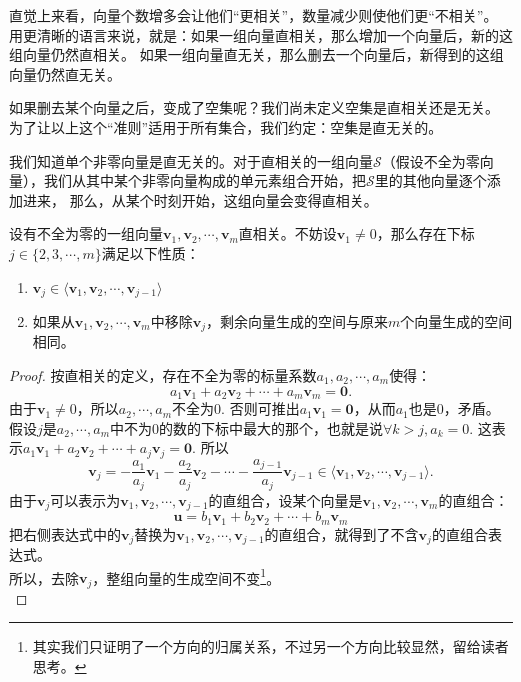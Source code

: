 \documentclass[12pt,UTF8,fontset=none]{ctexbook}
\begin{document}
直觉上来看，向量个数增多会让他们“更相关”，数量减少则使他们更“不相关”。
用更清晰的语言来说，就是：如果一组向量直相关，那么增加一个向量后，新的这组向量仍然直相关。
如果一组向量直无关，那么删去一个向量后，新得到的这组向量仍然直无关。

如果删去某个向量之后，变成了空集呢？我们尚未定义空集是直相关还是无关。
为了让以上这个“准则”适用于所有集合，我们约定：空集是直无关的。

我们知道单个非零向量是直无关的。对于直相关的一组向量$\mathcal{S}$（假设不全为零向量），我们从其中某个非零向量构成的单元素组合开始，把$\mathcal{S}$里的其他向量逐个添加进来，
那么，从某个时刻开始，这组向量会变得直相关。
\begin{pp}\label{pp:2_2}
    设有不全为零的一组向量$\mathbf{v}_1, \mathbf{v}_2 , \cdots , \mathbf{v}_m$直相关。不妨设$\mathbf{v}_1 \neq 0$，那么存在下标$j \in \{2,3, \cdots, m\}$满足以下性质：
    \begin{enumerate}
    \item $\mathbf{v}_j \in \langle \mathbf{v}_1, \mathbf{v}_2 , \cdots , \mathbf{v}_{j-1}\rangle$
    \item 如果从$\mathbf{v}_1, \mathbf{v}_2 , \cdots , \mathbf{v}_m$中移除$\mathbf{v}_j$，剩余向量生成的空间与原来$m$个向量生成的空间相同。
    \end{enumerate}
\end{pp}
\begin{proof} %
    按直相关的定义，存在不全为零的标量系数$a_1, a_2, \cdots, a_m$使得：
    $$ a_1\mathbf{v}_1+a_2\mathbf{v}_2+\cdots+a_m\mathbf{v}_m = \mathbf{0}. $$
    由于$\mathbf{v}_1 \neq 0$，所以$a_2, \cdots, a_m$不全为0. 否则可推出$a_1\mathbf{v}_1 = \mathbf{0}$，从而$a_1$也是0，矛盾。\\
    假设$j$是$a_2, \cdots, a_m$中不为0的数的下标中最大的那个，也就是说$\forall k > j, a_k = 0$. 这表示$ a_1\mathbf{v}_1+a_2\mathbf{v}_2+\cdots+a_j\mathbf{v}_j = \mathbf{0}. $
    所以
    $$ \mathbf{v}_j = -\frac{a_1}{a_j}\mathbf{v}_1-\frac{a_2}{a_j}\mathbf{v}_2-\cdots-\frac{a_{j-1}}{a_j}\mathbf{v}_{j-1} \in \langle \mathbf{v}_1, \mathbf{v}_2 , \cdots , \mathbf{v}_{j-1}\rangle. $$
    由于$ \mathbf{v}_j$可以表示为$\mathbf{v}_1, \mathbf{v}_2 , \cdots , \mathbf{v}_{j-1}$的直组合，设某个向量是$\mathbf{v}_1, \mathbf{v}_2 , \cdots , \mathbf{v}_m$的直组合：
    $$ \mathbf{u} = b_1\mathbf{v}_1+b_2\mathbf{v}_2+\cdots+b_m\mathbf{v}_m$$
    把右侧表达式中的$\mathbf{v}_j$替换为$\mathbf{v}_1, \mathbf{v}_2 , \cdots , \mathbf{v}_{j-1}$的直组合，就得到了不含$\mathbf{v}_j$的直组合表达式。\\
    所以，去除$\mathbf{v}_j$，整组向量的生成空间不变\footnote{其实我们只证明了一个方向的归属关系，不过另一个方向比较显然，留给读者思考。}。\\
\end{proof}
\end{document}

